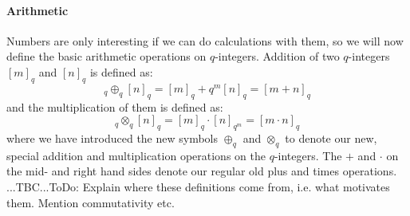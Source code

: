 \paragraph{Arithmetic}
Numbers are only interesting if we can do calculations with them, so we will now define the basic arithmetic operations on $q$-integers. Addition of two $q$-integers $[m]_q$ and $[n]_q$ is defined as:
\begin{equation}
[m]_q \oplus_q [n]_q = [m]_q + q^m [n]_q = [m + n]_q
\end{equation}
and the multiplication of them is defined as:
\begin{equation}
[m]_q \otimes_q [n]_q = [m]_q \cdot [n]_{q^m} = [m \cdot n]_q
\end{equation}
where we have introduced the new symbols $\oplus_q$ and $\otimes_q$ to denote our new, special addition and multiplication operations on the $q$-integers. The $+$ and $\cdot$ on the mid- and right hand sides denote our regular old plus and times operations. ...TBC...ToDo: Explain where these definitions come from, i.e. what motivates them. Mention commutativity etc.












